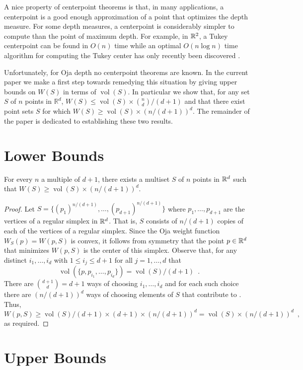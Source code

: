 \documentclass[lotsofwhite]{patmorin}
\DeclareMathOperator{\vol}{vol}
\begin{document}
A nice property of centerpoint theorems is that, in many applications,
a centerpoint is a good enough approximation of a point that optimizes
the depth measure.  For some depth measures, a centerpoint is
considerably simpler to compute than the point of maximum depth. For
example, in $\mathbb{R}^2$, a Tukey centerpoint can be found in $O(n)$ time
\cite{mxXX} while an optimal $O(n\log n)$ time algorithm for computing
the Tukey center has only recently been discovered \cite{c04}.

Unfortunately, for Oja depth no centerpoint theorems are known.  In
the current paper we make a first step towards remedying this
situation by giving upper bounds on $W(S)$ in terms of 
$\vol(S)$.  In particular we show that, for any set $S$
of $n$ points in $\mathbb{R}^d$, $W(S)\le \vol(S)\times {n\choose
d}/(d+1)$ and that there exist point sets $S$ for which $W(S)\ge
\vol(S)\times(n/(d+1))^d$.  The remainder of the paper is dedicated
to establishing these two results.

\section{Lower Bounds}

\begin{thm}
For every $n$ a multiple of $d+1$,
there exists a multiset $S$ of $n$ points in $\mathbb{R}^d$ such that
$W(S)\ge\vol(S)\times (n/(d+1))^d$.
\end{thm}

\begin{proof}
Let $S=\{(p_1)^{n/(d+1)},\ldots,(p_{d+1})^{n/(d+1)}\}$ where 
$p_1,\ldots,p_{d+1}$ are the vertices of a regular simplex
in $\mathbb{R}^d$.  That is, $S$ consists of $n/(d+1)$ copies of each of the
vertices of a regular simplex.
Since the Oja weight function $W_S(p)=W(p,S)$
is convex, it follows from symmetry that the point $p\in\mathbb{R}^d$ that
minimizes $W(p,S)$ is the center of this simplex.  Observe that, for
any distinct $i_1,\ldots,i_d$ with $1\le i_j\le d+1$ for all
$j=1,\ldots,d$ that
\[
   \vol(\{p,p_{i_1},\ldots,p_{i_d}\}) = \vol(S)/(d+1) \enspace .
\]
There are ${d+1 \choose d}=d+1$ ways of choosing $i_1,\ldots,i_d$ and
for each such choice there are $(n/(d+1))^d$ ways of choosing elements
of $S$ that contribute to . Thus,
\[
    W(p,S) \ge \vol(S)/(d+1)\times (d+1)\times (n/(d+1))^d
     = \vol(S)\times (n/(d+1))^d \enspace ,
\]
as required. 
\end{proof}

\section{Upper Bounds}
\end{document}
